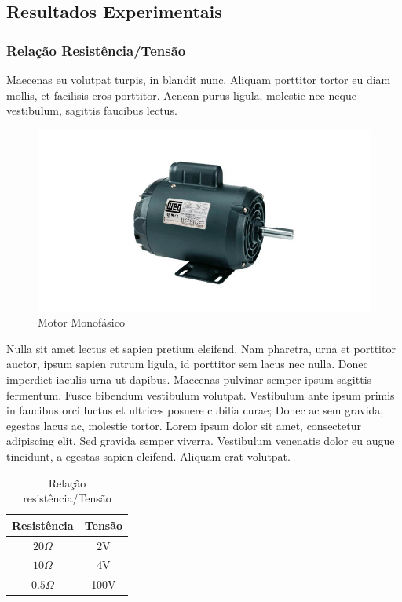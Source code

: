 \subsection{Resultados Experimentais}
\subsubsection{Relação Resistência/Tensão}
Maecenas eu volutpat turpis, in blandit nunc. Aliquam porttitor tortor eu diam mollis, et facilisis eros porttitor. Aenean purus ligula, molestie nec neque vestibulum, sagittis faucibus lectus. 

\begin{figure}[!htb]
    \centering
    \includegraphics[scale=0.1]{motor_mono.jpg}
    \caption{Motor Monofásico}
    \label{fig:motor}
\end{figure}

Nulla sit amet lectus et sapien pretium eleifend. Nam pharetra, urna et porttitor auctor, ipsum sapien rutrum ligula, id porttitor sem lacus nec nulla. Donec imperdiet iaculis urna ut dapibus. Maecenas pulvinar semper ipsum sagittis fermentum. Fusce bibendum vestibulum volutpat. Vestibulum ante ipsum primis in faucibus orci luctus et ultrices posuere cubilia curae; Donec ac sem gravida, egestas lacus ac, molestie tortor. Lorem ipsum dolor sit amet, consectetur adipiscing elit. Sed gravida semper viverra. Vestibulum venenatis dolor eu augue tincidunt, a egestas sapien eleifend. Aliquam erat volutpat. 

\begin{table}[!htb]
    \centering
    \begin{tabular}{c|c}
    \hline
    Resistência & Tensão \\ \hline
    $20 \Omega$ & 2V \\
    $10 \Omega$ & 4V \\
    $0.5\Omega$ & 100V \\ \hline
    \end{tabular}
    \caption{Relação resistência/Tensão}
    \label{tab:relação res/ten}
\end{table}

